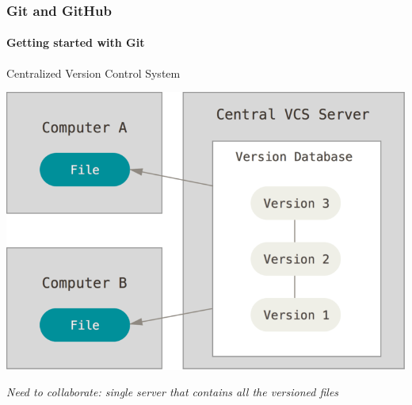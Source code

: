 \begin{frame}
    \frametitle{Git and GitHub}
    \framesubtitle{Getting started with Git}
    \addtocounter{nframe}{1}
    
    \begin{block}{Centralized Version Control System}
        \begin{center}

            \includegraphics[width=.7\textwidth]{imgs/centralized.png}
    
        \end{center}
    
    \end{block}

    \textit{Need to collaborate: single server that contains all the versioned files}

\end{frame}


